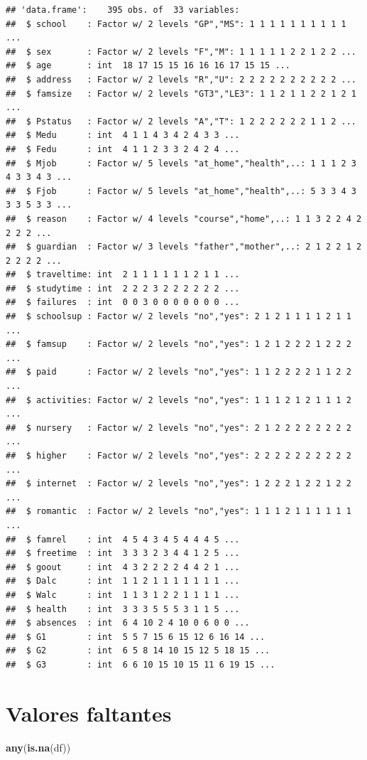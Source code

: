 \documentclass[
]{article}
\newenvironment{Shaded}{\begin{snugshade}}{\end{snugshade}}
\newcommand{\KeywordTok}[1]{\textcolor[rgb]{0.13,0.29,0.53}{\textbf{#1}}}
\newcommand{\NormalTok}[1]{#1}
\begin{document}
\begin{verbatim}
## 'data.frame':    395 obs. of  33 variables:
##  $ school    : Factor w/ 2 levels "GP","MS": 1 1 1 1 1 1 1 1 1 1 ...
##  $ sex       : Factor w/ 2 levels "F","M": 1 1 1 1 1 2 2 1 2 2 ...
##  $ age       : int  18 17 15 15 16 16 16 17 15 15 ...
##  $ address   : Factor w/ 2 levels "R","U": 2 2 2 2 2 2 2 2 2 2 ...
##  $ famsize   : Factor w/ 2 levels "GT3","LE3": 1 1 2 1 1 2 2 1 2 1 ...
##  $ Pstatus   : Factor w/ 2 levels "A","T": 1 2 2 2 2 2 2 1 1 2 ...
##  $ Medu      : int  4 1 1 4 3 4 2 4 3 3 ...
##  $ Fedu      : int  4 1 1 2 3 3 2 4 2 4 ...
##  $ Mjob      : Factor w/ 5 levels "at_home","health",..: 1 1 1 2 3 4 3 3 4 3 ...
##  $ Fjob      : Factor w/ 5 levels "at_home","health",..: 5 3 3 4 3 3 3 5 3 3 ...
##  $ reason    : Factor w/ 4 levels "course","home",..: 1 1 3 2 2 4 2 2 2 2 ...
##  $ guardian  : Factor w/ 3 levels "father","mother",..: 2 1 2 2 1 2 2 2 2 2 ...
##  $ traveltime: int  2 1 1 1 1 1 1 2 1 1 ...
##  $ studytime : int  2 2 2 3 2 2 2 2 2 2 ...
##  $ failures  : int  0 0 3 0 0 0 0 0 0 0 ...
##  $ schoolsup : Factor w/ 2 levels "no","yes": 2 1 2 1 1 1 1 2 1 1 ...
##  $ famsup    : Factor w/ 2 levels "no","yes": 1 2 1 2 2 2 1 2 2 2 ...
##  $ paid      : Factor w/ 2 levels "no","yes": 1 1 2 2 2 2 1 1 2 2 ...
##  $ activities: Factor w/ 2 levels "no","yes": 1 1 1 2 1 2 1 1 1 2 ...
##  $ nursery   : Factor w/ 2 levels "no","yes": 2 1 2 2 2 2 2 2 2 2 ...
##  $ higher    : Factor w/ 2 levels "no","yes": 2 2 2 2 2 2 2 2 2 2 ...
##  $ internet  : Factor w/ 2 levels "no","yes": 1 2 2 2 1 2 2 1 2 2 ...
##  $ romantic  : Factor w/ 2 levels "no","yes": 1 1 1 2 1 1 1 1 1 1 ...
##  $ famrel    : int  4 5 4 3 4 5 4 4 4 5 ...
##  $ freetime  : int  3 3 3 2 3 4 4 1 2 5 ...
##  $ goout     : int  4 3 2 2 2 2 4 4 2 1 ...
##  $ Dalc      : int  1 1 2 1 1 1 1 1 1 1 ...
##  $ Walc      : int  1 1 3 1 2 2 1 1 1 1 ...
##  $ health    : int  3 3 3 5 5 5 3 1 1 5 ...
##  $ absences  : int  6 4 10 2 4 10 0 6 0 0 ...
##  $ G1        : int  5 5 7 15 6 15 12 6 16 14 ...
##  $ G2        : int  6 5 8 14 10 15 12 5 18 15 ...
##  $ G3        : int  6 6 10 15 10 15 11 6 19 15 ...
\end{verbatim}

\hypertarget{valores-faltantes}{%
\section{Valores faltantes}\label{valores-faltantes}}

\begin{Shaded}
\begin{Highlighting}[]
\KeywordTok{any}\NormalTok{(}\KeywordTok{is.na}\NormalTok{(df))}
\end{Highlighting}
\end{Shaded}
\end{document}
